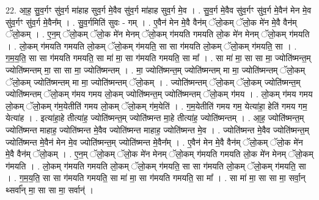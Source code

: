 \documentclass[17pt]{extarticle}
\begin{document}
22. आ॒ह॒ सु॒व॒र्गꣳ सु॑व॒र्ग मा॑हाह सुव॒र्ग मे॒वैव सु॑व॒र्ग मा॑हाह सुव॒र्ग मे॒व । . सु॒व॒र्ग मे॒वैव सु॑व॒र्गꣳ सु॑व॒र्ग मे॒वैन॑ मेन मे॒व सु॑व॒र्गꣳ सु॑व॒र्ग मे॒वैन᳚म् । . सु॒व॒र्गमिति॑ सुवः - गम् । . ए॒वैन॑ मेन मे॒वै वैन॑म् ॅलो॒कम् ॅलो॒क मे॑न मे॒वै वैन॑म् ॅलो॒कम् । . ए॒न॒म् ॅलो॒कम् ॅलो॒क मे॑न मेनम् ॅलो॒कम् ग॑मयति गमयति लो॒क मे॑न मेनम् ॅलो॒कम् ग॑मयति । . लो॒कम् ग॑मयति गमयति लो॒कम् ॅलो॒कम् ग॑मयति॒ सा सा ग॑मयति लो॒कम् ॅलो॒कम् ग॑मयति॒ सा । . ग॒म॒य॒ति॒ सा सा ग॑मयति गमयति॒ सा मा॑ मा॒ सा ग॑मयति गमयति॒ सा मा᳚ । . सा मा॑ मा॒ सा सा मा॒ ज्योति॑ष्मन्त॒म् ज्योति॑ष्मन्तम् मा॒ सा सा मा॒ ज्योति॑ष्मन्तम् । . मा॒ ज्योति॑ष्मन्त॒म् ज्योति॑ष्मन्तम् मा मा॒ ज्योति॑ष्मन्तम् ॅलो॒कम् ॅलो॒कम् ज्योति॑ष्मन्तम् मा मा॒ ज्योति॑ष्मन्तम् ॅलो॒कम् । . ज्योति॑ष्मन्तम् ॅलो॒कम् ॅलो॒कम् ज्योति॑ष्मन्त॒म् ज्योति॑ष्मन्तम् ॅलो॒कम् ग॑मय गमय लो॒कम् ज्योति॑ष्मन्त॒म् ज्योति॑ष्मन्तम् ॅलो॒कम् ग॑मय । . लो॒कम् ग॑मय गमय लो॒कम् ॅलो॒कम् ग॑म॒येतीति॑ गमय लो॒कम् ॅलो॒कम् ग॑म॒येति॑ । . ग॒म॒येतीति॑ गमय गम॒ येत्या॑हा॒ हेति॑ गमय गम॒ येत्या॑ह । . इत्या॑हा॒हे तीत्या॑ह॒ ज्योति॑ष्मन्त॒म् ज्योति॑ष्मन्त मा॒हे तीत्या॑ह॒ ज्योति॑ष्मन्तम् । . आ॒ह॒ ज्योति॑ष्मन्त॒म् ज्योति॑ष्मन्त माहाह॒ ज्योति॑ष्मन्त मे॒वैव ज्योति॑ष्मन्त माहाह॒ ज्योति॑ष्मन्त मे॒व । . ज्योति॑ष्मन्त मे॒वैव ज्योति॑ष्मन्त॒म् ज्योति॑ष्मन्त मे॒वैन॑ मेन मे॒व ज्योति॑ष्मन्त॒म् ज्योति॑ष्मन्त मे॒वैन᳚म् । . ए॒वैन॑ मेन मे॒वै वैन॑म् ॅलो॒कम् ॅलो॒क मे॑न मे॒वै वैन॑म् ॅलो॒कम् । . ए॒न॒म् ॅलो॒कम् ॅलो॒क मे॑न मेनम् ॅलो॒कम् ग॑मयति गमयति लो॒क मे॑न मेनम् ॅलो॒कम् ग॑मयति । . लो॒कम् ग॑मयति गमयति लो॒कम् ॅलो॒कम् ग॑मयति॒ सा सा ग॑मयति लो॒कम् ॅलो॒कम् ग॑मयति॒ सा । . ग॒म॒य॒ति॒ सा सा ग॑मयति गमयति॒ सा मा॑ मा॒ सा ग॑मयति गमयति॒ सा मा᳚ । . सा मा॑ मा॒ सा सा मा॒ सर्वा॒न् थ्सर्वा᳚न् मा॒ सा सा मा॒ सर्वान्॑ । \newline
\end{document}
